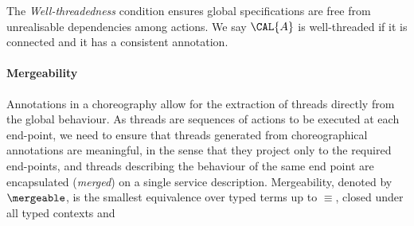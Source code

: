 

The \emph{Well-threadedness} condition ensures global specifications
are free from unrealisable dependencies among actions. We say $\CAL{A}$
is well-threaded if it is connected and it has a consistent
annotation. 



\paragraph{Mergeability}
 Annotations in a choreography allow for the extraction of threads
 directly from the global behaviour. As threads are 
 sequences of actions to be executed at each end-point, we need to ensure that
 threads generated from choreographical annotations are meaningful, in
 the sense that they project only to the required end-points, and
 threads describing the behaviour of the same end point are
 encapsulated (\emph{merged})  on a single service description. 
  Mergeability, denoted by $\mergeable$, is the smallest equivalence
  over typed terms up to $\equiv$, closed under all typed contexts and

